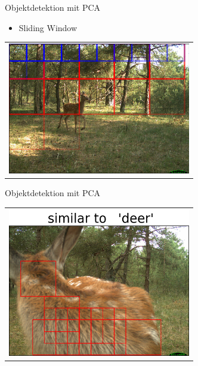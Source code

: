 \begin{frame}[t,fragile]{Objektdetektion mit  PCA}

	\begin{itemize}
 \item{Sliding Window}
  \end{itemize}
  \vspace{0.01em}
  {
\begin{table}
\centering
        \begin{tabular}{c}
        \includegraphics[width=8cm]{images/Segmentierung/sliding.png}\\
         \end{tabular}
\end{table}
 }

\end{frame}


\begin{frame}[t,fragile]{Objektdetektion mit  PCA}
  \vspace{0.01em}
  {
\begin{table}
\centering
        \begin{tabular}{c}
        \includegraphics[width=8cm]{images/Segmentierung/seg(1).png}\\
         \end{tabular}
\end{table}
 }

\end{frame}


